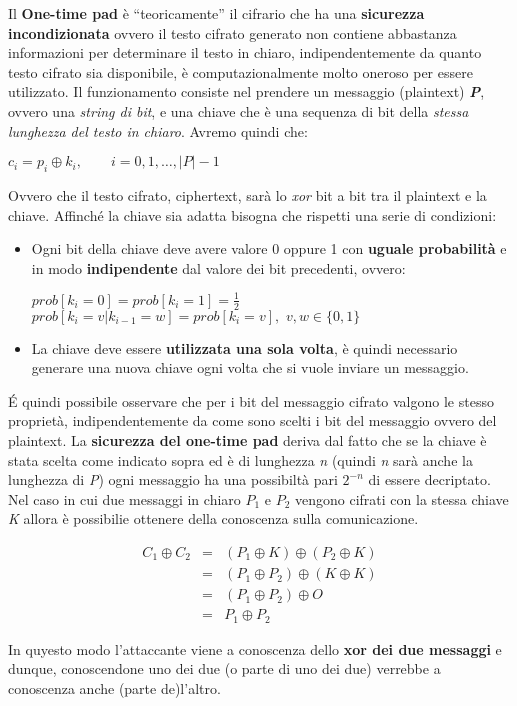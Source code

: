 Il \textbf{One-time pad} è ``teoricamente'' il cifrario che ha una \textbf{sicurezza incondizionata} ovvero il testo cifrato generato non contiene abbastanza informazioni per determinare il testo in chiaro, indipendentemente da quanto testo cifrato sia disponibile, è computazionalmente molto oneroso per essere utilizzato. Il funzionamento consiste nel prendere un messaggio (plaintext) \textbf{\textit{P}}, ovvero una \textit{string di bit}, e una chiave che è una sequenza di bit della \textit{stessa lunghezza del testo in chiaro}. Avremo quindi che:
\begin{center}
    $c_i = p_i\oplus k_i,\qquad i=0,1,\ldots,|P|-1$
\end{center}
Ovvero che il testo cifrato, ciphertext, sarà lo \textit{xor} bit a bit tra il plaintext e la chiave. 
\newline
Affinché la chiave sia adatta bisogna che rispetti una serie di condizioni:
\begin{itemize}
    \item Ogni bit della chiave deve avere valore 0 oppure 1 con \textbf{uguale probabilità} e in modo \textbf{indipendente} dal valore dei bit precedenti, ovvero: 
    \begin{center}
        $prob[k_i=0]=prob[k_i=1]=\frac{1}{2}\quad$
        \\
        $prob[k_i=v|k_{i-1}=w]=prob[k_i=v],\,\,v,w\in\{0,1\}$
    \end{center}
    \item La chiave deve essere \textbf{utilizzata una sola volta}, è quindi necessario generare una nuova chiave ogni volta che si vuole inviare un messaggio.
\end{itemize}
\'{E} quindi possibile osservare che per i bit del messaggio cifrato valgono le stesso proprietà, indipendentemente da come sono scelti i bit del messaggio ovvero del plaintext.
\newline
La \textbf{sicurezza del one-time pad} deriva dal fatto che se la chiave è stata scelta come indicato sopra ed è di lunghezza \textit{n} (quindi \textit{n} sarà anche la lunghezza di \textit{P}) ogni messaggio ha una possibiltà pari $2^{-n}$ di essere decriptato. Nel caso in cui due messaggi in chiaro \textit{$P_1$}  e \textit{$P_2$} vengono cifrati con la stessa chiave \textit{K} allora è possibilie ottenere della conoscenza sulla comunicazione. 
\begin{center}
    \begin{eqnarray*}
        C_1\oplus C_2&=&(P_1\oplus K)\oplus(P_2\oplus K)\\
                    &=&(P_1\oplus P_2)\oplus(K\oplus K)\\
                    &=&(P_1\oplus P_2)\oplus O\\
                    &=&P_1\oplus P_2
    \end{eqnarray*}
\end{center}
In quyesto modo l'attaccante viene a conoscenza dello \textbf{xor dei due messaggi} e dunque, conoscendone uno dei due (o parte di uno dei due) verrebbe a conoscenza anche (parte de)l'altro.


